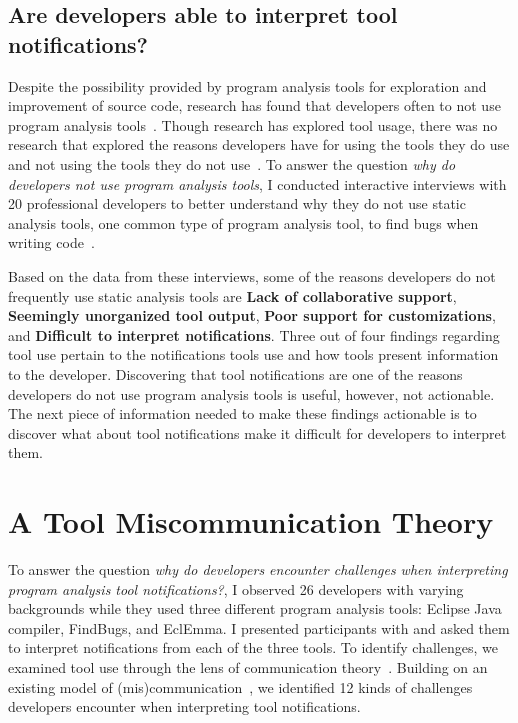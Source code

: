 \documentclass{llncs}
\begin{document}


\subsection{Are developers able to interpret tool notifications?}
Despite the possibility provided by program analysis tools for exploration and improvement of source code, research has found that developers often to not use program analysis tools~\cite{Ayewah:2008:FindBugs,ge2012reconciling}.
Though research has explored tool usage, there was no research that explored the reasons developers have for using the tools they do use and not using the tools they do not use~\cite{Bessey:2010:Coverity,Khoo:2008:PathProjection}.
To answer the question \emph{why do developers not use program analysis tools}, I conducted interactive interviews with 20 professional developers to better understand why they do not use static analysis tools, one common type of program analysis tool, to find bugs when writing code~\cite{johnson2013don}.

Based on the data from these interviews, some of the reasons developers do not frequently use static analysis tools are \textbf{Lack of collaborative support}, \textbf{Seemingly unorganized tool output}, \textbf{Poor support for customizations}, and \textbf{Difficult to interpret notifications}. 
Three out of four findings regarding tool use pertain to the notifications tools use and how tools present information to the developer.
Discovering that tool notifications are one of the reasons developers do not use program analysis tools is useful, however, not actionable. The next piece of information needed to make these findings actionable is to discover what about tool notifications make it difficult for developers to interpret them.

\section{A Tool Miscommunication Theory}\label{sec:theory}
To answer the question \emph{why do developers encounter challenges when interpreting program analysis tool notifications?}, I observed 26 developers with varying backgrounds while they used three different program analysis tools: Eclipse Java compiler, FindBugs, and EclEmma. I presented participants with and asked them to interpret notifications from each of the three tools. 
To identify challenges, we examined tool use through the lens of communication theory~\cite{bowman1987modeling}.
Building on an existing model of (mis)communication~\cite{mustajoki2008modelling}, we identified 12 kinds of challenges developers encounter when interpreting tool notifications.
\end{document}
